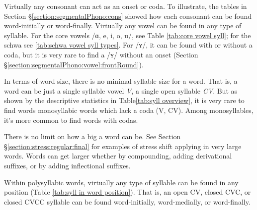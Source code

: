 Virtually any consonant can act as an onset or coda. To illustrate, the tables in Section \S\ref{section:segmentalPhono:cons} showed how each consonant can be found word-initially or word-finally. Virtually any vowel can be found in any type of syllable. For the core vowels /ɑ, e, i, o, u/, see Table \ref{tab:core vowel syll}; for the schwa see \ref{tab:schwa vowel syll types}.  For /ʏ/, it can be found with or without a coda, but it is very rare to find a /ʏ/ without an onset (Section \S\ref{section:segmentalPhono:vowel:frontRound}). 




In terms of word size,    there is no minimal syllable size for a word. That is, a word can be just a single syllable vowel \textit{V}, a single open syllable \textit{CV}. But as shown by the descriptive statistics  in Table\ref{tab:syll overview}, it is very rare to find words monosyllabic words which lack a coda (V, CV). Among monosyllables, it's more common to find words with codas.


There is no limit on how a big a word can be. See Section \S\ref{section:stress:regular:final} for examples of stress shift applying in very large words. Words can get larger whether by compounding, adding derivational suffixes, or by adding inflectional suffixes.  

Within polysyllabic words, virtually any type of syllable can be found in any position (Table \ref{tab:syll in word position}). That is, an open CV,  closed CVC, or closed CVCC syllable can be found word-initially, word-medially, or word-finally. 


